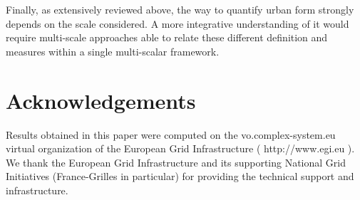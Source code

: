 \documentclass[letterpaper]{article}
\begin{document}
Finally, as extensively reviewed above, the way to quantify urban form strongly depends on the scale considered. A more integrative understanding of it would require multi-scale approaches able to relate these different definition and measures within a single multi-scalar framework.








\section{Acknowledgements}

Results obtained in this paper were computed on the vo.complex-system.eu virtual organization of the European Grid Infrastructure ( http://www.egi.eu ). We thank the European Grid Infrastructure and its supporting National Grid Initiatives (France-Grilles in particular) for providing the technical support and infrastructure.

\footnotesize

\end{document}
